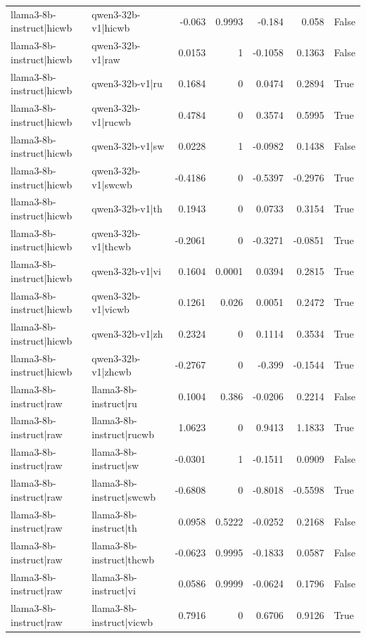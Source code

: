 \begin{table}
\begin{tabular}{l l r r r r l}
llama3-8b-instruct|hicwb & qwen3-32b-v1|hicwb & -0.063 & 0.9993 & -0.184 & 0.058 & False \\
llama3-8b-instruct|hicwb & qwen3-32b-v1|raw & 0.0153 & 1 & -0.1058 & 0.1363 & False \\
llama3-8b-instruct|hicwb & qwen3-32b-v1|ru & 0.1684 & 0 & 0.0474 & 0.2894 & True \\
llama3-8b-instruct|hicwb & qwen3-32b-v1|rucwb & 0.4784 & 0 & 0.3574 & 0.5995 & True \\
llama3-8b-instruct|hicwb & qwen3-32b-v1|sw & 0.0228 & 1 & -0.0982 & 0.1438 & False \\
llama3-8b-instruct|hicwb & qwen3-32b-v1|swcwb & -0.4186 & 0 & -0.5397 & -0.2976 & True \\
llama3-8b-instruct|hicwb & qwen3-32b-v1|th & 0.1943 & 0 & 0.0733 & 0.3154 & True \\
llama3-8b-instruct|hicwb & qwen3-32b-v1|thcwb & -0.2061 & 0 & -0.3271 & -0.0851 & True \\
llama3-8b-instruct|hicwb & qwen3-32b-v1|vi & 0.1604 & 0.0001 & 0.0394 & 0.2815 & True \\
llama3-8b-instruct|hicwb & qwen3-32b-v1|vicwb & 0.1261 & 0.026 & 0.0051 & 0.2472 & True \\
llama3-8b-instruct|hicwb & qwen3-32b-v1|zh & 0.2324 & 0 & 0.1114 & 0.3534 & True \\
llama3-8b-instruct|hicwb & qwen3-32b-v1|zhcwb & -0.2767 & 0 & -0.399 & -0.1544 & True \\
llama3-8b-instruct|raw & llama3-8b-instruct|ru & 0.1004 & 0.386 & -0.0206 & 0.2214 & False \\
llama3-8b-instruct|raw & llama3-8b-instruct|rucwb & 1.0623 & 0 & 0.9413 & 1.1833 & True \\
llama3-8b-instruct|raw & llama3-8b-instruct|sw & -0.0301 & 1 & -0.1511 & 0.0909 & False \\
llama3-8b-instruct|raw & llama3-8b-instruct|swcwb & -0.6808 & 0 & -0.8018 & -0.5598 & True \\
llama3-8b-instruct|raw & llama3-8b-instruct|th & 0.0958 & 0.5222 & -0.0252 & 0.2168 & False \\
llama3-8b-instruct|raw & llama3-8b-instruct|thcwb & -0.0623 & 0.9995 & -0.1833 & 0.0587 & False \\
llama3-8b-instruct|raw & llama3-8b-instruct|vi & 0.0586 & 0.9999 & -0.0624 & 0.1796 & False \\
llama3-8b-instruct|raw & llama3-8b-instruct|vicwb & 0.7916 & 0 & 0.6706 & 0.9126 & True \\

\end{tabular}
\end{table}
